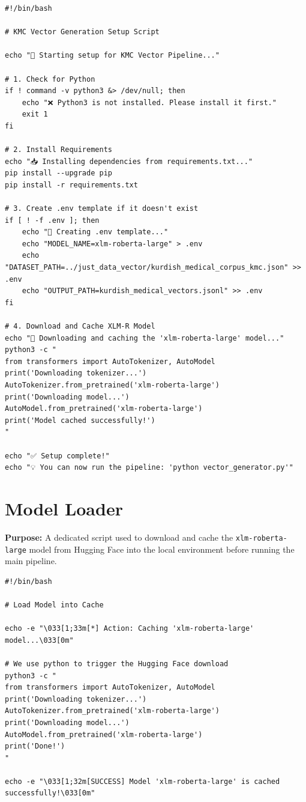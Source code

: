 \documentclass[11pt]{article}
\begin{document}
\begin{lstlisting}[style=bashcode, caption={setup.sh}]
#!/bin/bash

# KMC Vector Generation Setup Script

echo "🚀 Starting setup for KMC Vector Pipeline..."

# 1. Check for Python
if ! command -v python3 &> /dev/null; then
    echo "❌ Python3 is not installed. Please install it first."
    exit 1
fi

# 2. Install Requirements
echo "📥 Installing dependencies from requirements.txt..."
pip install --upgrade pip
pip install -r requirements.txt

# 3. Create .env template if it doesn't exist
if [ ! -f .env ]; then
    echo "📝 Creating .env template..."
    echo "MODEL_NAME=xlm-roberta-large" > .env
    echo "DATASET_PATH=../just_data_vector/kurdish_medical_corpus_kmc.json" >> .env
    echo "OUTPUT_PATH=kurdish_medical_vectors.jsonl" >> .env
fi

# 4. Download and Cache XLM-R Model
echo "🧠 Downloading and caching the 'xlm-roberta-large' model..."
python3 -c "
from transformers import AutoTokenizer, AutoModel
print('Downloading tokenizer...')
AutoTokenizer.from_pretrained('xlm-roberta-large')
print('Downloading model...')
AutoModel.from_pretrained('xlm-roberta-large')
print('Model cached successfully!')
"

echo "✅ Setup complete!"
echo "💡 You can now run the pipeline: 'python vector_generator.py'"
\end{lstlisting}


\section{Model Loader} \label{sec:loader}
\textbf{Purpose:} A dedicated script used to download and cache the \texttt{xlm-roberta-large} model from Hugging Face into the local environment before running the main pipeline.

\begin{lstlisting}[style=bashcode, caption={load\_model\_gpu\_1.sh}]
#!/bin/bash

# Load Model into Cache

echo -e "\033[1;33m[*] Action: Caching 'xlm-roberta-large' model...\033[0m"

# We use python to trigger the Hugging Face download
python3 -c "
from transformers import AutoTokenizer, AutoModel
print('Downloading tokenizer...')
AutoTokenizer.from_pretrained('xlm-roberta-large')
print('Downloading model...')
AutoModel.from_pretrained('xlm-roberta-large')
print('Done!')
"

echo -e "\033[1;32m[SUCCESS] Model 'xlm-roberta-large' is cached successfully!\033[0m"
\end{lstlisting}
\end{document}

